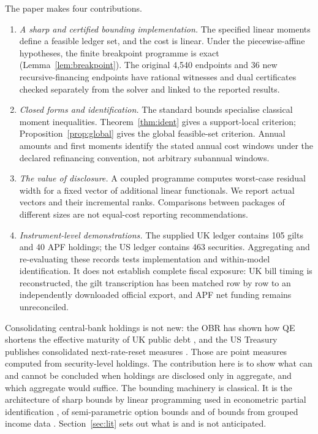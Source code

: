 \documentclass[11pt,a4paper]{article}
\theoremstyle{remark}
\begin{document}
The paper makes four contributions.
\begin{enumerate}
\item \emph{A sharp and certified bounding implementation.} The specified linear moments define a feasible ledger set, and the cost is linear. Under the piecewise-affine hypotheses, the finite breakpoint programme is exact (Lemma~\ref{lem:breakpoint}). The original 4,540 endpoints and 36 new recursive-financing endpoints have rational witnesses and dual certificates checked separately from the solver and linked to the reported results.
\item \emph{Closed forms and identification.} The standard bounds specialise classical moment inequalities. Theorem~\ref{thm:ident} gives a support-local criterion; Proposition~\ref{prop:global} gives the global feasible-set criterion. Annual amounts and first moments identify the stated annual cost windows under the declared refinancing convention, not arbitrary subannual windows.
\item \emph{The value of disclosure.} A coupled programme computes worst-case residual width for a fixed vector of additional linear functionals. We report actual vectors and their incremental ranks. Comparisons between packages of different sizes are not equal-cost reporting recommendations.
\item \emph{Instrument-level demonstrations.} The supplied UK ledger contains 105 gilts and 40 APF holdings; the US ledger contains 463 securities. Aggregating and re-evaluating these records tests implementation and within-model identification. It does not establish complete fiscal exposure: UK bill timing is reconstructed, the gilt transcription has been matched row by row to an independently downloaded official export, and APF net funding remains unreconciled.
\end{enumerate}

Consolidating central-bank holdings is not new: the OBR has shown how QE shortens the effective maturity of UK public debt \citep{OBR2021box}, and the US Treasury publishes consolidated next-rate-reset measures \citep{TBAC2026}. Those are point measures computed from security-level holdings. The contribution here is to show what can and cannot be concluded when holdings are disclosed only in aggregate, and which aggregate would suffice. The bounding machinery is classical. It is the architecture of sharp bounds by linear programming used in econometric partial identification \citep{ManskiTamer2002,MogstadSantosTorgovitsky2018}, of semi-parametric option bounds \citep{Lo1987,BertsimasPopescu2002} and of bounds from grouped income data \citep{Gastwirth1972}. Section~\ref{sec:lit} sets out what is and is not anticipated.
\end{document}
